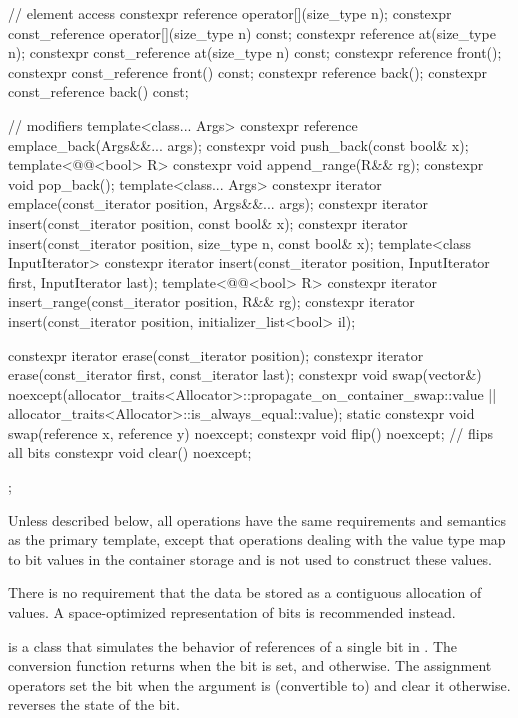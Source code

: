 \begin{codeblock}
{{    // element access
    constexpr reference       operator[](size_type n);
    constexpr const_reference operator[](size_type n) const;
    constexpr reference       at(size_type n);
    constexpr const_reference at(size_type n) const;
    constexpr reference       front();
    constexpr const_reference front() const;
    constexpr reference       back();
    constexpr const_reference back() const;

    // modifiers
    template<class... Args> constexpr reference emplace_back(Args&&... args);
    constexpr void push_back(const bool& x);
    template<@@<bool> R>
      constexpr void append_range(R&& rg);
    constexpr void pop_back();
    template<class... Args> constexpr iterator emplace(const_iterator position, Args&&... args);
    constexpr iterator insert(const_iterator position, const bool& x);
    constexpr iterator insert(const_iterator position, size_type n, const bool& x);
    template<class InputIterator>
      constexpr iterator insert(const_iterator position,
                                InputIterator first, InputIterator last);
    template<@@<bool> R>
      constexpr iterator insert_range(const_iterator position, R&& rg);
    constexpr iterator insert(const_iterator position, initializer_list<bool> il);

    constexpr iterator erase(const_iterator position);
    constexpr iterator erase(const_iterator first, const_iterator last);
    constexpr void swap(vector&)
      noexcept(allocator_traits<Allocator>::propagate_on_container_swap::value ||
               allocator_traits<Allocator>::is_always_equal::value);
    static constexpr void swap(reference x, reference y) noexcept;
    constexpr void flip() noexcept;     // flips all bits
    constexpr void clear() noexcept;
  };
}
\end{codeblock}%

\pnum
Unless described below, all operations have the same requirements and
semantics as the  primary template, except that operations
dealing with the  value type map to bit values in the
container storage and
is not used to construct these values.

\pnum
There is no requirement that the data be stored as a contiguous allocation
of  values. A space-optimized representation of bits is
recommended instead.

\pnum
{}
is a class that simulates the behavior of references of a single bit in
. The conversion function returns 
when the bit is set, and  otherwise. The assignment operators
set the bit when the argument is (convertible to)  and
clear it otherwise.  reverses the state of the bit.

